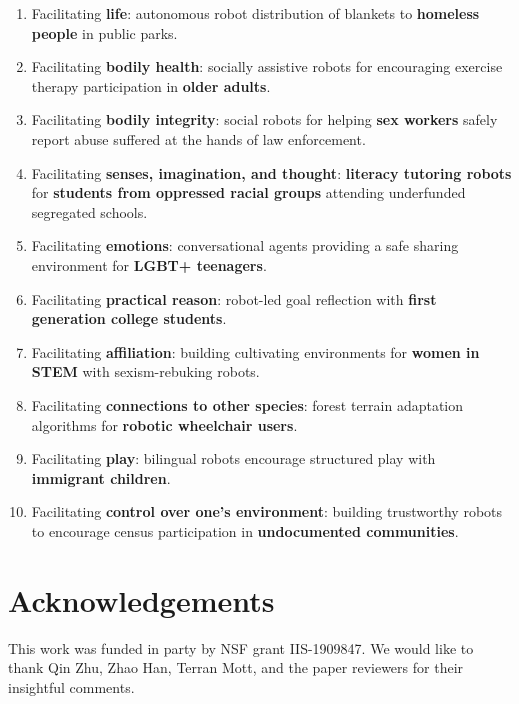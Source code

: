 \documentclass[letterpaper]{article} %
\begin{document}
    \begin{enumerate}
    \item Facilitating \textbf{life}:  autonomous robot distribution of blankets to \textbf{homeless people} in public parks.
    \item Facilitating \textbf{bodily health}: socially assistive robots for encouraging exercise therapy participation in \textbf{older adults}.
    \item Facilitating \textbf{bodily integrity}: social robots for helping \textbf{sex workers} safely report abuse suffered at the hands of law enforcement.
    \item Facilitating \textbf{senses, imagination, and thought}:  \textbf{literacy tutoring robots} for \textbf{students from oppressed racial groups} attending underfunded segregated schools.
    \item Facilitating \textbf{emotions}:  conversational agents providing a safe sharing environment for \textbf{LGBT+ teenagers}.
    \item Facilitating \textbf{practical reason}: robot-led goal reflection with \textbf{first generation college students}.
    \item Facilitating \textbf{affiliation}: building cultivating environments for \textbf{women in STEM} with sexism-rebuking robots.
    \item Facilitating \textbf{connections to other species}: forest terrain adaptation algorithms for \textbf{robotic wheelchair users}.
    \item Facilitating \textbf{play}:  bilingual robots encourage structured play with \textbf{immigrant children}.
    \item Facilitating \textbf{control over one's environment}: building trustworthy robots to encourage census participation in \textbf{undocumented communities}.
    \end{enumerate}

\section*{Acknowledgements}
This work was funded in party by NSF grant IIS-1909847. We would like to thank Qin Zhu, Zhao Han, Terran Mott, and the paper reviewers for their insightful comments.

%

\end{document}
